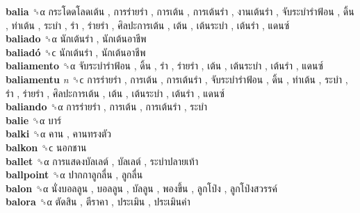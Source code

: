\textbf{balia} ␝α   กระโดดโลดเต้น ,  การร่ายรำ ,  การเต้น ,  การเต้นรำ ,  งานเต้นรำ ,  จับระบำรำฟ้อน ,  ดิ้น ,  ท่าเต้น ,  ระบำ ,  รำ ,  ร่ายรำ ,  ศิลปะการเต้น ,  เต้น ,  เต้นระบำ ,  เต้นรำ ,  แดนซ์   \\
\textbf{baliado} ␝α   นักเต้นรำ ,  นักเต้นอาชีพ   \\
\textbf{baliadó} ␝ϲ   นักเต้นรำ ,  นักเต้นอาชีพ   \\
\textbf{baliamento} ␝α   จับระบำรำฟ้อน ,  ดิ้น ,  รำ ,  ร่ายรำ ,  เต้น ,  เต้นระบำ ,  เต้นรำ ,  แดนซ์   \\
\textbf{baliamentu} \emph{n}  ␝ϲ   การร่ายรำ ,  การเต้น ,  การเต้นรำ ,  จับระบำรำฟ้อน ,  ดิ้น ,  ท่าเต้น ,  ระบำ ,  รำ ,  ร่ายรำ ,  ศิลปะการเต้น ,  เต้น ,  เต้นระบำ ,  เต้นรำ ,  แดนซ์   \\
\textbf{baliando} ␝α   การร่ายรำ ,  การเต้น ,  การเต้นรำ ,  ระบำ   \\
\textbf{balie} ␝α   บาร์   \\
\textbf{balki} ␝α   คาน ,  คานทรงตัว   \\
\textbf{balkon} ␝ϲ   นอกชาน   \\
\textbf{ballet} ␝α   การแสดงบัลเลต์ ,  บัลเลต์ ,  ระบำปลายเท้า   \\
\textbf{ballpoint} ␝α   ปากกาลูกลื่น ,  ลูกลื่น   \\
\textbf{balon} ␝α   นั่งบอลลูน ,  บอลลูน ,  บัลลูน ,  พองขึ้น ,  ลูกโป่ง ,  ลูกโป่งสวรรค์   \\
\textbf{balora} ␝α   ตัดสิน ,  ตีราคา ,  ประเมิน ,  ประเมินค่า   \\
